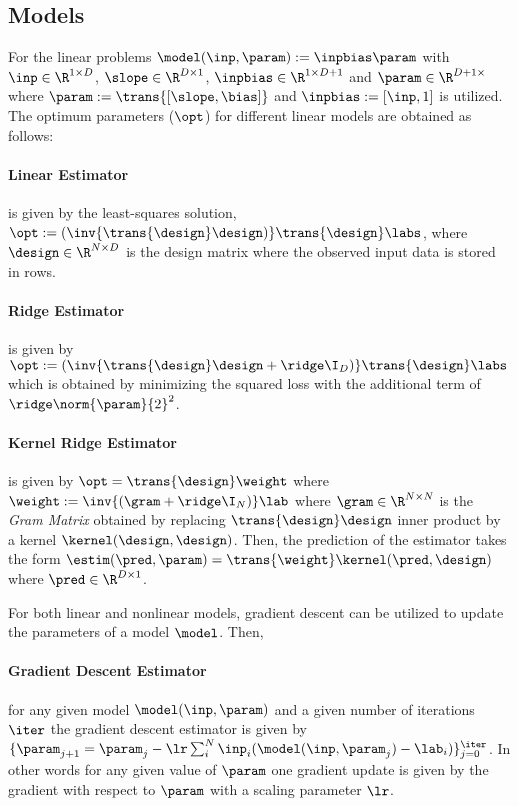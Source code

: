 \subsection{Models} 

For the linear problems $\model(\inp, \param):=\inpbias\param$ with $\inp\in\R^{1\times D}$, $\slope\in\R^{D\times 1}$, $\inpbias\in\R^{1\times D+1}$ and $\param\in\R^{D+1\times}$ where $\param:=\trans{[\slope, \bias]}$ and $\inpbias:=[\inp, 1]$ is utilized. The optimum parameters ($\opt$) for different linear models are obtained as follows:

\paragraph{Linear Estimator} is given by the least-squares solution, $\opt:=(\inv{\trans{\design}\design)}\trans{\design}\labs$, where $\design\in\R^{N\times D}$ is the design matrix where the observed input data is stored in rows.

\paragraph{Ridge Estimator} is given by $\opt:=(\inv{\trans{\design}\design+\ridge \I_{D})}\trans{\design}\labs$ which is obtained by minimizing the squared loss with the additional term of $\ridge\norm{\param}{2}^2$. %


\paragraph{Kernel Ridge Estimator} is given by $\opt= \trans{\design}\weight$ where $\weight:=\inv{(\gram+\ridge\I_{N})}\lab$ where $\gram\in\R^{N\times N}$ is the  \textit{Gram Matrix} obtained by replacing $\trans{\design}\design$ inner product by a kernel $\kernel(\design, \design)$. Then, the prediction of the estimator takes the form $\estim(\pred,\param)=\trans{\weight}\kernel(\pred,\design)$ where $\pred\in\R^{D\times 1}$.

For both linear and nonlinear models, gradient descent can be utilized to update the parameters of a model $\model$. Then,

\paragraph{Gradient Descent Estimator} for any given model $\model(\inp, \param)$ and a given number of iterations $\iter$ the gradient descent estimator is given by $\{\param_{j+1}=\param_{j} - \lr\sum_i^{N}\inp_i(\model(\inp,\param_j)-\lab_i)\}_{j=0}^{\iter}$. In other words for any given value of $\param$ one gradient update is given by the gradient with respect to $\param$ with a scaling parameter $\lr$. 

